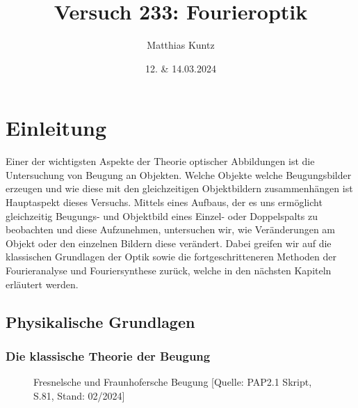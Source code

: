 \documentclass{article}
\title{Versuch 233: Fourieroptik}
\author{Matthias Kuntz}
\date{12. \& 14.03.2024}
\begin{document}
\maketitle

\tableofcontents

\newpage

\section{Einleitung}

Einer der wichtigsten Aspekte der Theorie optischer Abbildungen ist die Untersuchung von Beugung an Objekten. Welche Objekte welche Beugungsbilder erzeugen und wie diese mit den gleichzeitigen Objektbildern zusammenhängen ist Hauptaspekt dieses Versuchs. Mittels eines Aufbaus, der es uns ermöglicht gleichzeitig Beugungs- und Objektbild eines Einzel- oder Doppelspalts zu beobachten und diese Aufzunehmen, untersuchen wir, wie Veränderungen am Objekt oder den einzelnen Bildern diese verändert. Dabei greifen wir auf die klassischen Grundlagen der Optik sowie die fortgeschritteneren Methoden der Fourieranalyse und Fouriersynthese zurück, welche in den nächsten Kapiteln erläutert werden.   


\subsection{Physikalische Grundlagen}
\subsubsection{Die klassische Theorie der Beugung}

\begin{figure}[!b]
    \centering
    \caption{Fresnelsche und Fraunhofersche Beugung [Quelle: PAP2.1 Skript, S.81, Stand: 02/2024]}
    \label{fig:fresnel_fraunhofer}
\end{figure}
\end{document}
